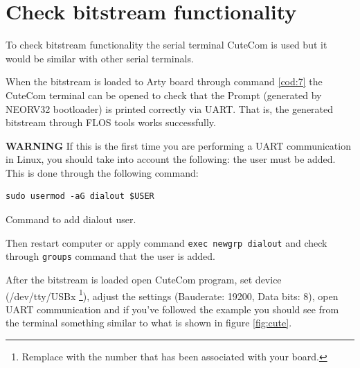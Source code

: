 \section{Check bitstream functionality}

\label{check}

To check bitstream functionality the serial terminal CuteCom \cite{gh:cutecom} is used but it would be similar with other serial terminals.

\vspace{5mm}

\noindent When the bitstream is loaded to Arty board through command \ref{cod:7} the CuteCom terminal can be opened to check that the Prompt (generated by NEORV32 bootloader) is printed correctly via UART.
That is, the generated bitstream through FLOS tools works successfully. 

\vspace{5mm}

\noindent \textbf{WARNING} If this is the first time you are performing a UART communication in Linux, you should take into account the following: the  user must be added. This is done through the following command: 

\begin{code}
\begin{verbatim}
sudo usermod -aG dialout $USER
\end{verbatim}
\caption{Command to add dialout user.}
\label{cod:9}
\end{code}

\vspace{5mm}

\noindent Then restart computer or apply command \texttt{exec newgrp dialout} and check through \texttt{groups} command that the user  is added.

\vspace{5mm}

\noindent After the bitstream is loaded open CuteCom program, set device (/dev/tty/USBx \footnote{Remplace  with the number that has been associated with your board.}), adjust the settings (Bauderate: 19200, Data bits: 8), open UART communication and if you've followed the example you should see from the terminal something similar to what is shown in figure \ref{fig:cute}.

